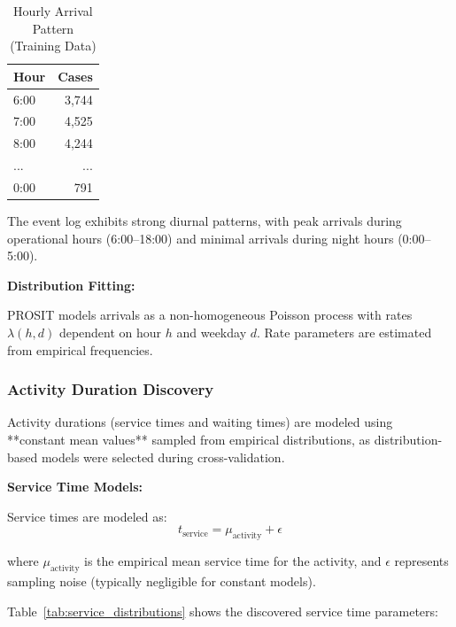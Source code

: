         \begin{table}[h]
        \centering
        \caption{Hourly Arrival Pattern (Training Data)}
        \label{tab:arrival_pattern}
        \begin{tabular}{lr}
        \toprule
        \textbf{Hour} & \textbf{Cases} \\
        \midrule
        6:00 & 3,744 \\
        7:00 & 4,525 \\
        8:00 & 4,244 \\
        ... & ... \\
        0:00 & 791 \\
        \bottomrule
        \end{tabular}
        \end{table}
        
        The event log exhibits strong diurnal patterns, with peak arrivals during operational hours (6:00--18:00) and minimal arrivals during night hours (0:00--5:00).
        
        \textbf{Distribution Fitting:}
        
        PROSIT models arrivals as a non-homogeneous Poisson process with rates $\lambda(h, d)$ dependent on hour $h$ and weekday $d$. Rate parameters are estimated from empirical frequencies.

        \subsubsection{Activity Duration Discovery}
        
        Activity durations (service times and waiting times) are modeled using **constant mean values** sampled from empirical distributions, as distribution-based models were selected during cross-validation.
        
        \textbf{Service Time Models:}
        
        Service times are modeled as:
        \begin{equation}
        t_{\text{service}} = \mu_{\text{activity}} + \epsilon
        \end{equation}
        
        where $\mu_{\text{activity}}$ is the empirical mean service time for the activity, and $\epsilon$ represents sampling noise (typically negligible for constant models).
        
        Table~\ref{tab:service_distributions} shows the discovered service time parameters:
        
